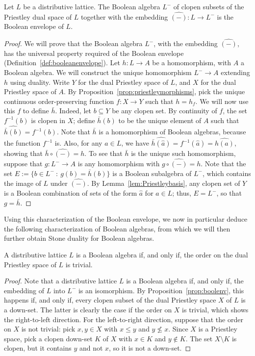 \begin{proposition}\label{prop:boolenv}
Let $L$ be a distributive lattice. The Boolean algebra $L^-$ of clopen subsets of the Priestley dual space of $L$ together with the embedding $\widehat{(-)} \colon L \to L^-$ is the Boolean envelope of $L$. 
\end{proposition}
\begin{proof} 
We will prove that the Boolean algebra $L^-$, with the embedding $\widehat{(-)}$, has the universal property required of the Boolean envelope (Definition~\ref{def:booleanenvelope}). Let $h \colon L \to A$ be a homomorphism, with $A$ a Boolean algebra. We will construct the unique homomorphism $L^- \to A$ extending $h$ using duality. Write $Y$ for the dual Priestley space of $L$, and $X$ for the dual Priestley space of $A$. By Proposition~\ref{prop:priestleymorphisms}, pick the unique continuous order-preserving function $f \colon X \to Y$ such that $h = h_f$. We will now use this $f$ to define $\bar{h}$. Indeed, let $b \subseteq Y$ be any clopen set. By continuity of $f$, the set $f^{-1}(b)$ is clopen in $X$; define $\bar{h}(b)$ to be the unique element of $A$ such that $\widehat{\bar{h}(b)} = f^{-1}(b)$. Note that $\bar{h}$ is a homomorphism of Boolean algebras, because the function $f^{-1}$ is. Also, for any $a \in L$, we have $\widehat{\bar{h}(\widehat{a})} = f^{-1}(\widehat{a}) = \widehat{h(a)}$, showing that $\bar{h} \circ \widehat{(-)} = h$. To see that $\bar{h}$ is the unique such homomorphism, suppose that $g \colon L^- \to A$ is any homomorphism with $g \circ \widehat{(-)} = h$. Note that the set $E := \{ b \in L^- \ \colon \ g(b) = \bar{h}(b)\}$ is a Boolean subalgebra of $L^-$, which contains the image of $L$ under $\widehat{(-)}$. By Lemma~\ref{lem:Priestleybasis}, any clopen set of $Y$ is a Boolean combination of sets of the form $\widehat{a}$ for $a \in L$; thus, $E = L^-$, so that $g = \bar{h}$.
\end{proof}
Using this characterization of the Boolean envelope, we now in particular deduce the following characterization of Boolean algebras, from which we will then further obtain Stone duality for Boolean algebras.
\begin{proposition}\label{prop:boolean-trivial-order}
A distributive lattice $L$ is a Boolean algebra if, and only if, the order on the dual Priestley space of $L$ is trivial.
\end{proposition}
\begin{proof}
Note that a distributive lattice $L$ is a Boolean algebra if, and only if, the embedding of $L$ into $L^-$ is an isomorphism. By Proposition~\ref{prop:boolenv}, this happens if, and only if, every clopen subset of the dual Priestley space $X$ of $L$ is a down-set. The latter is clearly the case if the order on $X$ is trivial, which shows the right-to-left direction. For the left-to-right direction, suppose that the order on $X$ is not trivial: pick $x, y \in X$ with $x \leq y$ and $y \nleq x$. Since $X$ is a Priestley space, pick a clopen down-set $K$ of $X$ with $x \in K$ and $y \not\in K$. The set $X \setminus K$ is clopen, but it contains $y$ and not $x$, so it is not a down-set.
\end{proof}
